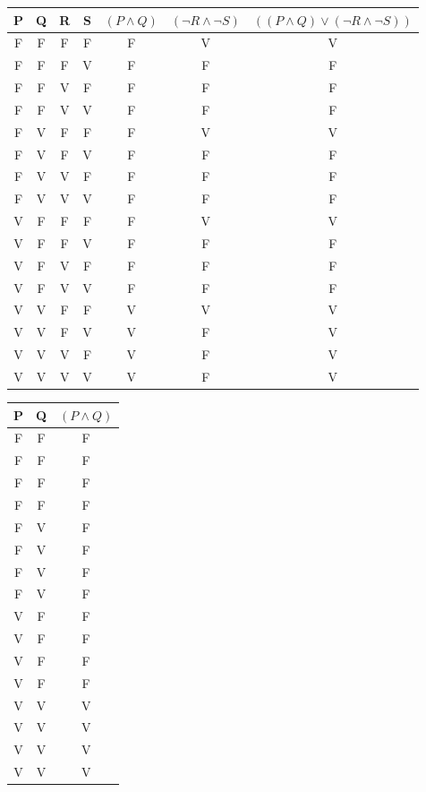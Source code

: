 \documentclass{article}
\begin{document}
\pagecolor{black}
\color{white}

\begin{center}
\renewcommand{\arraystretch}{1.5}
\begin{tabular}{|c|c|c|c|c|c|c|}
\hline
P & Q & R & S & $(P \land Q)$ & $(\neg R \land \neg S)$ & $((P \land Q) \lor (\neg R \land \neg S))$ \\
\hline
F & F & F & F & F & V & V \\
\hline
F & F & F & V & F & F & F \\
\hline
F & F & V & F & F & F & F \\
\hline
F & F & V & V & F & F & F \\
\hline
F & V & F & F & F & V & V \\
\hline
F & V & F & V & F & F & F \\
\hline
F & V & V & F & F & F & F \\
\hline
F & V & V & V & F & F & F \\
\hline
V & F & F & F & F & V & V \\
\hline
V & F & F & V & F & F & F \\
\hline
V & F & V & F & F & F & F \\
\hline
V & F & V & V & F & F & F \\
\hline
V & V & F & F & V & V & V \\
\hline
V & V & F & V & V & F & V \\
\hline
V & V & V & F & V & F & V \\
\hline
V & V & V & V & V & F & V \\
\hline
\end{tabular}
\end{center}

\newpage

\begin{center}
    \renewcommand{\arraystretch}{1.5}
    \begin{tabular}{|c|c|c|}
    \hline
    P & Q & $(P \land Q)$ \\
    \hline
    F & F & F \\
    \hline
    F & F & F \\
    \hline
    F & F & F \\
    \hline
    F & F & F \\
    \hline
    F & V & F \\
    \hline
    F & V & F \\
    \hline
    F & V & F \\
    \hline
    F & V & F \\
    \hline
    V & F & F \\
    \hline
    V & F & F \\
    \hline
    V & F & F \\
    \hline
    V & F & F \\
    \hline
    V & V & V \\
    \hline
    V & V & V \\
    \hline
    V & V & V \\
    \hline
    V & V & V \\
    \hline
    \end{tabular}
    \end{center}
\end{document}
